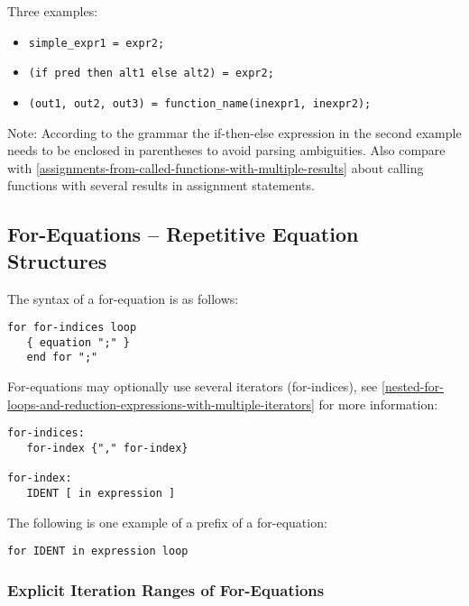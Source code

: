 Three examples:
\begin{itemize}
\item \lstinline!simple_expr1 = expr2;!
\item \lstinline!(if pred then alt1 else alt2) = expr2;!
\item \lstinline!(out1, out2, out3) = function_name(inexpr1, inexpr2);!
\end{itemize}

\begin{nonnormative}
Note: According to the grammar the if-then-else expression in
the second example needs to be enclosed in parentheses to avoid parsing
ambiguities. Also compare with \cref{assignments-from-called-functions-with-multiple-results} about calling
functions with several results in assignment statements.
\end{nonnormative}

\subsection{For-Equations -- Repetitive Equation Structures}\label{for-equations-repetitive-equation-structures}

The syntax of a for-equation is as follows:
\begin{lstlisting}[language=grammar]
for for-indices loop
   { equation ";" }
   end for ";"
\end{lstlisting}

For-equations may optionally use several iterators (for-indices), see \cref{nested-for-loops-and-reduction-expressions-with-multiple-iterators} for more information:
\begin{lstlisting}[language=grammar]
for-indices:
   for-index {"," for-index}

for-index:
   IDENT [ in expression ]
\end{lstlisting}

The following is one example of a prefix of a for-equation:
\begin{lstlisting}[language=grammar]
for IDENT in expression loop
\end{lstlisting}

\subsubsection{Explicit Iteration Ranges of For-Equations}\label{explicit-iteration-ranges-of-for-equations}

